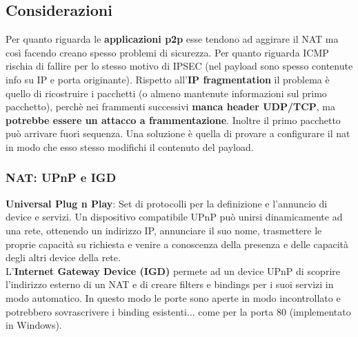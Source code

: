 \documentclass[12pt]{article}
\begin{document}
			\subsection{Considerazioni}
				Per quanto riguarda le \textbf{applicazioni p2p} esse tendono ad aggirare il NAT ma così facendo creano spesso problemi di sicurezza. Per quanto riguarda ICMP rischia di fallire per lo stesso motivo di IPSEC (nel payload sono spesso contenute info su IP e porta originante). Rispetto all'\textbf{IP fragmentation} il problema è quello di ricostruire i pacchetti (o almeno mantenute informazioni sul primo pacchetto), perchè nei frammenti successivi \textbf{manca header UDP/TCP}, ma \textbf{potrebbe essere un attacco a frammentazione}. Inoltre il primo pacchetto può arrivare fuori sequenza. Una soluzione è quella di provare a configurare il nat in modo che esso stesso modifichi il contenuto del payload.
			\subsubsection{NAT: UPnP e IGD}
				\textbf{Universal Plug n Play}: Set di protocolli per la definizione  e l'annuncio di device e servizi. Un dispositivo compatibile UPnP può unirsi dinamicamente ad una rete, ottenendo un indirizzo IP, annunciare il suo nome, trasmettere le proprie capacità su richiesta e venire a conoscenza della presenza e delle capacità degli altri device della rete.\\
				L'\textbf{Internet Gateway Device (IGD) } permete ad un device UPnP di scoprire l'indirizzo esterno di un NAT e di creare filters e bindings per i suoi servizi in modo automatico. In questo modo le porte sono aperte in modo incontrollato  e potrebbero sovrascrivere i binding esistenti... come per la porta 80 (implementato in Windows).
				
				
				
		
			
			
				
			
			
			
			 
						
		
		
		
			
		
				 
\end{document}

